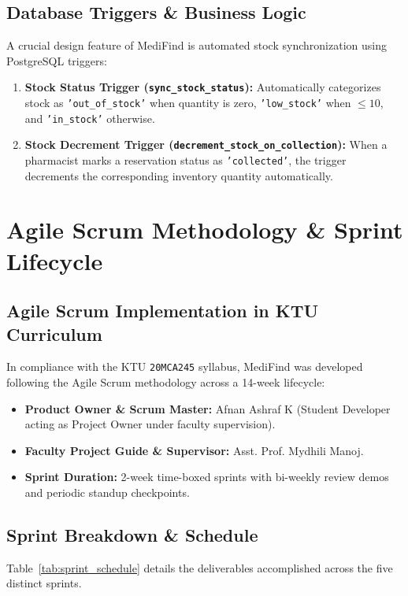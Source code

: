 \documentclass[12pt,a4paper]{report}
\begin{document}
\section{Database Triggers & Business Logic}
A crucial design feature of MediFind is automated stock synchronization using PostgreSQL triggers:
\begin{enumerate}
    \item \textbf{Stock Status Trigger (\texttt{sync\_stock\_status}):} Automatically categorizes stock as \texttt{'out\_of\_stock'} when quantity is zero, \texttt{'low\_stock'} when $\le 10$, and \texttt{'in\_stock'} otherwise.
    \item \textbf{Stock Decrement Trigger (\texttt{decrement\_stock\_on\_collection}):} When a pharmacist marks a reservation status as \texttt{'collected'}, the trigger decrements the corresponding inventory quantity automatically.
\end{enumerate}

\newpage
\chapter{Agile Scrum Methodology \& Sprint Lifecycle}

\section{Agile Scrum Implementation in KTU Curriculum}
In compliance with the KTU \texttt{20MCA245} syllabus, MediFind was developed following the Agile Scrum methodology across a 14-week lifecycle:
\begin{itemize}
    \item \textbf{Product Owner & Scrum Master:} Afnan Ashraf K (Student Developer acting as Project Owner under faculty supervision).
    \item \textbf{Faculty Project Guide & Supervisor:} Asst. Prof. Mydhili Manoj.
    \item \textbf{Sprint Duration:} 2-week time-boxed sprints with bi-weekly review demos and periodic standup checkpoints.
\end{itemize}

\section{Sprint Breakdown & Schedule}
Table~\ref{tab:sprint_schedule} details the deliverables accomplished across the five distinct sprints.
\end{document}
